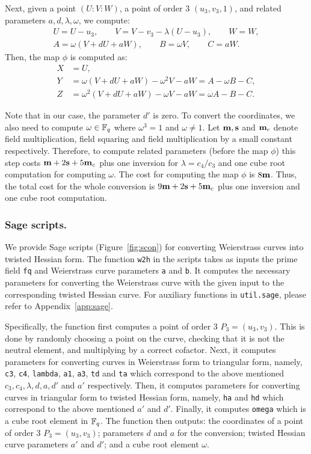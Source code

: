 Next,
given a point $(U:V:W)$, a point of order 3 $(u_3,v_3,1)$, and related parameters
$a,d,\lambda,\omega$,
we compute:
\begin{gather*}
U = U - u_3, \qquad
V = V - v_3 - \lambda (U - u_3), \qquad
W = W, \\
A = \omega(V + dU + aW),	\qquad
B = \omega V,	\qquad
C = aW.
\end{gather*}
Then, the map $\phi$ is computed as:
\begin{align*}
X &= U,	\\
Y &= \omega(V + dU + aW) - \omega^2V - aW = A - \omega B - C,	\\
Z &= \omega^2(V + dU + aW) - \omega V - aW = \omega A - B - C.
\end{align*}

Note that in our case, the parameter $d'$ is zero.
To convert the coordinates, we also need to compute $\omega \in \mathbb{F}_{q}$
where $\omega^3 = 1$ and $\omega \ne 1$.
Let $\textbf{m}, \textbf{s}$ and $\textbf{m}_{c}$ denote
field multiplication, field squaring and field multiplication by a small constant respectively.
Therefore, to compute related parameters (before the map $\phi$)
this step costs $\textbf{m} + 2\textbf{s} + 5\textbf{m}_{c}$
plus one inversion for $\lambda = c_4 / c_3$
and one cube root computation for computing $\omega$.
The cost for computing the map $\phi$ is $8\textbf{m}$.
Thus, the total cost for the whole conversion is $9\textbf{m} + 2\textbf{s} + 5\textbf{m}_{c}$
plus one inversion and one cube root computation.


\subsubsection{Sage scripts.}
We provide Sage scripts (Figure~\ref{fig:scon})
for converting Weierstrass curves into twisted Hessian form.
The function \texttt{w2h} in the scripts takes as inputs
the prime field \texttt{fq} and
Weierstrass curve parameters \texttt{a} and \texttt{b}.
It computes the necessary parameters for converting the Weierstrass curve
with the given input to the corresponding twisted Hessian curve.
For auxiliary functions in \texttt{util.sage}, please refer to Appendix~\ref{app:sage}.

Specifically, the function first computes a point of order 3 $P_3 = (u_3,v_3)$.
This is done by randomly choosing a point on the curve,
checking that it is not the neutral element,
and multiplying by a correct cofactor.
Next, it computes parameters for converting curves in Weierstrass form to triangular form,
namely, \texttt{c3}, \texttt{c4}, \texttt{lambda}, \texttt{a1}, \texttt{a3}, \texttt{td} and \texttt{ta}
which correspond to the above mentioned $c_3, c_4, \lambda, d, a, d'$ and $a'$ respectively.
Then, it computes parameters for converting curves in triangular form to twisted Hessian form,
namely, \texttt{ha} and \texttt{hd} which correspond to the above mentioned $a'$ and $d'$.
Finally, it computes \texttt{omega} which is a cube root element in $\mathbb{F}_{q}$.
The function then outputs:
the coordinates of a point of order 3 $P_3 = (u_3,v_3)$;
parameters $d$ and $a$ for the conversion;
twisted Hessian curve parameters $a'$ and $d'$;
and a cube root element $\omega$.


